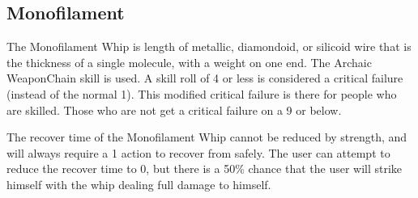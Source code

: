 \documentclass[twoside]{book}
\begin{document}
    

\subsection{Monofilament}
    
    {  
      The Monofilament Whip is length of metallic,
               diamondoid, or silicoid wire that is the thickness of a
               single molecule, with a weight on one end. The Archaic
               WeaponChain skill is used. A skill roll of 4 or
               less is considered a critical failure (instead of the
               normal 1). This modified critical failure is there for
               people who are skilled. Those who are not get a critical
               failure on a 9 or below. 
    }
  
    {  
      The recover time of the Monofilament Whip cannot be
               reduced by strength, and will always require a 1 action to
               recover from safely. The user can attempt to reduce the
               recover time to 0, but there is a 50\% chance that the user
               will strike himself with the whip dealing full damage to
               himself. 
    }
  
\end{document}
